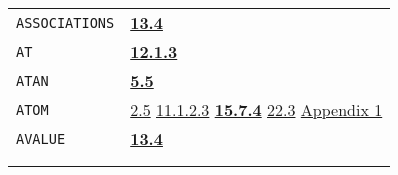 \documentclass[a4paper]{scrbook}
\begin{document}
\begin{longtable}[]{@{}ll@{}}
\begin{minipage}[t]{0.24\columnwidth}
\texttt{ASSOCIATIONS}\strut
\end{minipage} & \begin{minipage}[t]{0.70\columnwidth}\raggedright\strut
\textbf{\href{13-association-properties.md\#134-examining-associations}{13.4}}\strut
\end{minipage}\tabularnewline
\begin{minipage}[t]{0.24\columnwidth}\raggedright\strut
\texttt{AT}\strut
\end{minipage} & \begin{minipage}[t]{0.70\columnwidth}\raggedright\strut
\textbf{\href{12-locatives.md\#1213-at}{12.1.3}}\strut
\end{minipage}\tabularnewline
\begin{minipage}[t]{0.24\columnwidth}\raggedright\strut
\texttt{ATAN}\strut
\end{minipage} & \begin{minipage}[t]{0.70\columnwidth}\raggedright\strut
\textbf{\href{05-simple-functions.md\#55-examples-comments-1}{5.5}}\strut
\end{minipage}\tabularnewline
\begin{minipage}[t]{0.24\columnwidth}\raggedright\strut
\texttt{ATOM}\strut
\end{minipage} & \begin{minipage}[t]{0.70\columnwidth}\raggedright\strut
\href{02-read-evaluate-print.md\#25-example-type-atom-pname-1}{2.5} \href{11-input-output.md\#11123-princ}{11.1.2.3}
\textbf{\href{15-lexical-blocking.md\#1574-atom}{15.7.4}} \href{22-storage-management.md\#223-other-storage}{22.3}
\href{appendix-1-a-look-inside.md\#basic-data-structures}{Appendix 1}\strut
\end{minipage}\tabularnewline
\begin{minipage}[t]{0.24\columnwidth}\raggedright\strut
\texttt{AVALUE}\strut
\end{minipage} & \begin{minipage}[t]{0.70\columnwidth}\raggedright\strut
\textbf{\href{13-association-properties.md\#134-examining-associations}{13.4}}\strut
\end{minipage}\tabularnewline
\begin{minipage}[t]{0.24\columnwidth}\raggedright\strut
\strut
\end{minipage} & \begin{minipage}[t]{0.70\columnwidth}\raggedright\strut
\strut
\end{minipage}\tabularnewline
\begin{minipage}[t]{0.24\columnwidth}\raggedright\strut

\end{minipage}
\end{longtable}
\end{document}
